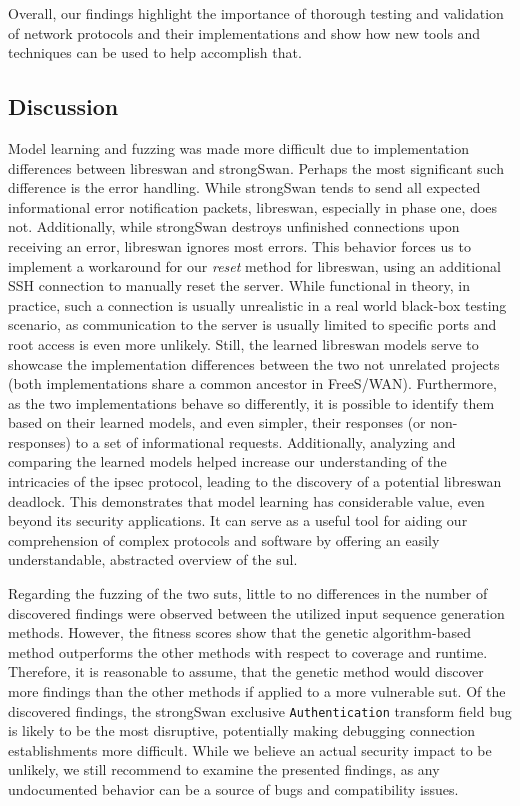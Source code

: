 Overall, our findings highlight the importance of thorough testing and validation of network protocols and their implementations and show how new tools and techniques can be used to help accomplish that.

\subsection{Discussion}
Model learning and fuzzing was made more difficult due to implementation differences between libreswan and strongSwan. Perhaps the most significant such difference is the error handling. While strongSwan tends to send all expected informational error notification packets, libreswan, especially in phase one, does not. Additionally, while strongSwan destroys unfinished connections upon receiving an error, libreswan ignores most errors. This behavior forces us to implement a workaround for our \emph{reset} method for libreswan, using an additional SSH connection to manually reset the server. While functional in theory, in practice, such a connection is usually unrealistic in a real world black-box testing scenario, as communication to the server is usually limited to specific ports and root access is even more unlikely. Still, the learned libreswan models serve to showcase the implementation differences between the two not unrelated projects (both implementations share a common ancestor in FreeS/WAN). Furthermore, as the two implementations behave so differently, it is possible to identify them based on their learned models, and even simpler, their responses (or non-responses) to a set of informational requests. Additionally, analyzing and comparing the learned models helped increase our understanding of the intricacies of the \ac{ipsec} protocol, leading to the discovery of a potential libreswan deadlock. This demonstrates that model learning has considerable value, even beyond its security applications. It can serve as a useful tool for aiding our comprehension of complex protocols and software by offering an easily understandable, abstracted overview of the \ac{sul}.

Regarding the fuzzing of the two \acp{sut}, little to no differences in the number of discovered findings were observed between the utilized input sequence generation methods. However, the fitness scores show that the genetic algorithm-based method outperforms the other methods with respect to coverage and runtime. Therefore, it is reasonable to assume, that the genetic method would discover more findings than the other methods if applied to a more vulnerable \ac{sut}. Of the discovered findings, the strongSwan exclusive \texttt{Authentication} transform field bug is likely to be the most disruptive, potentially making debugging connection establishments more difficult. While we believe an actual security impact to be unlikely, we still recommend to examine the presented findings, as any undocumented behavior can be a source of bugs and compatibility issues. 

